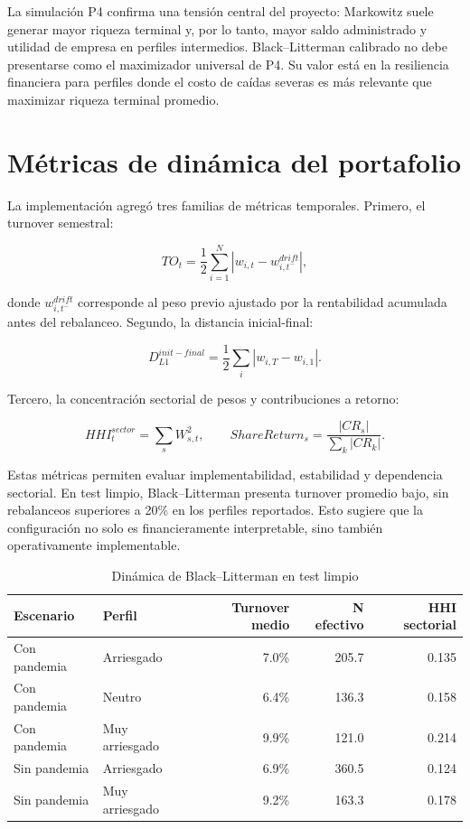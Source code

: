 \documentclass[11pt]{article}
\begin{document}
La simulaci\'on P4 confirma una tensi\'on central del proyecto: Markowitz suele generar mayor riqueza terminal y, por lo tanto, mayor saldo administrado y utilidad de empresa en perfiles intermedios. Black--Litterman calibrado no debe presentarse como el maximizador universal de P4. Su valor est\'a en la resiliencia financiera para perfiles donde el costo de ca\'idas severas es m\'as relevante que maximizar riqueza terminal promedio.

\section{M\'etricas de din\'amica del portafolio}

La implementaci\'on agreg\'o tres familias de m\'etricas temporales. Primero, el turnover semestral:

\[
TO_t = \frac{1}{2}\sum_{i=1}^{N}|w_{i,t} - w_{i,t^-}^{drift}|,
\]

donde $w_{i,t^-}^{drift}$ corresponde al peso previo ajustado por la rentabilidad acumulada antes del rebalanceo. Segundo, la distancia inicial-final:

\[
D_{L1}^{init-final} = \frac{1}{2}\sum_i |w_{i,T} - w_{i,1}|.
\]

Tercero, la concentraci\'on sectorial de pesos y contribuciones a retorno:

\[
HHI^{sector}_t = \sum_s W_{s,t}^2, \qquad
ShareReturn_s = \frac{|CR_s|}{\sum_k |CR_k|}.
\]

Estas m\'etricas permiten evaluar implementabilidad, estabilidad y dependencia sectorial. En test limpio, Black--Litterman presenta turnover promedio bajo, sin rebalanceos superiores a 20\% en los perfiles reportados. Esto sugiere que la configuraci\'on no solo es financieramente interpretable, sino tambi\'en operativamente implementable.

\begin{table}[H]
\centering
\caption{Din\'amica de Black--Litterman en test limpio}
\label{tab:dinamica}
\begin{tabular}{l l r r r}
\toprule
Escenario & Perfil & Turnover medio & N efectivo & HHI sectorial \\
\midrule
Con pandemia & Arriesgado & 7.0\% & 205.7 & 0.135 \\
Con pandemia & Neutro & 6.4\% & 136.3 & 0.158 \\
Con pandemia & Muy arriesgado & 9.9\% & 121.0 & 0.214 \\
Sin pandemia & Arriesgado & 6.9\% & 360.5 & 0.124 \\
Sin pandemia & Muy arriesgado & 9.2\% & 163.3 & 0.178 \\
\bottomrule
\end{tabular}
\end{table}
\end{document}
